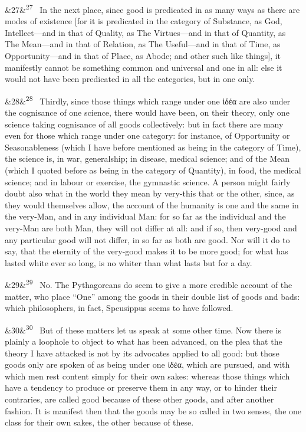 \documentclass[12pt]{article}
\newcommand{\para}[1][]{\par\noindent\ifx&#1&\else\textsuperscript{\footnotesize #1}~\fi}
\begin{document}
\para[27] In the next place, since good is predicated in as many ways as there are modes of existence [for it is predicated in the category of Substance, as God, Intellect---and in that of Quality, as The Virtues---and in that of Quantity, as The Mean---and in that of Relation, as The Useful---and in that of Time, as Opportunity---and in that of Place, as Abode; and other such like things], it manifestly cannot be something common and universal and one in all: else it would not have been predicated in all the categories, but in one only.

\para[28] Thirdly, since those things which range under one ἰδέα are also under the cognisance of one science, there would have been, on their theory, only one science taking cognisance of all goods collectively: but in fact there are many even for those which range under one category: for instance, of Opportunity or Seasonableness (which I have before mentioned as being in the category of Time), the science is, in war, generalship; in disease, medical science; and of the Mean (which I quoted before as being in the category of Quantity), in food, the medical science; and in labour or exercise, the gymnastic science. A person might fairly doubt also what in the world they mean by very-this that or the other, since, as they would themselves allow, the account of the humanity is one and the same in the very-Man, and in any individual Man: for so far as the individual and the very-Man are both Man, they will not differ at all: and if so, then very-good and any particular good will not differ, in so far as both are good. Nor will it do to say, that the eternity of the very-good makes it to be more good; for what has lasted white ever so long, is no whiter than what lasts but for a day.

\para[29] No. The Pythagoreans do seem to give a more credible account of the matter, who place “One” among the goods in their double list of goods and bads: which philosophers, in fact, Speusippus seems to have followed.

\para[30] But of these matters let us speak at some other time. Now there is plainly a loophole to object to what has been advanced, on the plea that the theory I have attacked is not by its advocates applied to all good: but those goods only are spoken of as being under one ἰδέα, which are pursued, and with which men rest content simply for their own sakes: whereas those things which have a tendency to produce or preserve them in any way, or to hinder their contraries, are called good because of these other goods, and after another fashion. It is manifest then that the goods may be so called in two senses, the one class for their own sakes, the other because of these.
\end{document}
